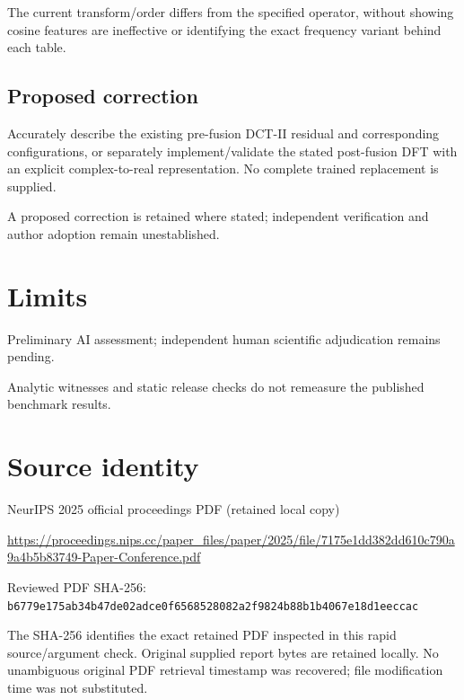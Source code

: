 \documentclass[11pt]{article}
\begin{document}
The current transform/order differs from the specified operator, without showing cosine features are ineffective or identifying the exact frequency variant behind each table.

\subsection*{Proposed correction}

Accurately describe the existing pre-fusion DCT-II residual and corresponding configurations, or separately implement/validate the stated post-fusion DFT with an explicit complex-to-real representation. No complete trained replacement is supplied.

A proposed correction is retained where stated; independent verification and author adoption remain unestablished.

\section*{Limits}

Preliminary AI assessment; independent human scientific adjudication remains pending.\par

Analytic witnesses and static release checks do not remeasure the published benchmark results.\par

\section*{Source identity}

NeurIPS 2025 official proceedings PDF (retained local copy)

\url{https://proceedings.nips.cc/paper_files/paper/2025/file/7175e1dd382dd610c790a9a4b5b83749-Paper-Conference.pdf}

Reviewed PDF SHA-256: \nolinkurl{b6779e175ab34b47de02adce0f6568528082a2f9824b88b1b4067e18d1eeccac}

The SHA-256 identifies the exact retained PDF inspected in this rapid source/argument check. Original supplied report bytes are retained locally. No unambiguous original PDF retrieval timestamp was recovered; file modification time was not substituted.
\end{document}
